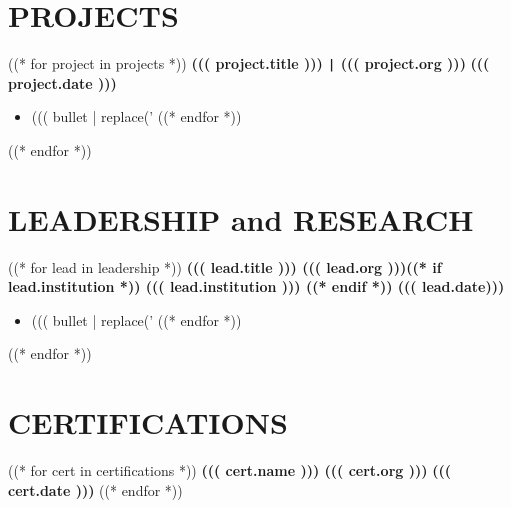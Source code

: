 \documentclass[10pt]{article}
\begin{document}
\vspace{-0.75cm}
\section*{PROJECTS}
\vspace{-0.1cm}
((* for project in projects *))
\noindent
\textbf{((( project.title ))) \texttt{|} ((( project.org )))} \hfill \textbf{((( project.date )))} \\
\vspace{-0.4cm}
\begin{itemize}[leftmargin=0.6cm, itemsep=-0.1cm, topsep=0cm]
((* for bullet in project.bullets *))
    \item ((( bullet | replace('%
((* endfor *))
\end{itemize}
((* endfor *))

\vspace{-0.4cm}
\section*{LEADERSHIP and RESEARCH}
\vspace{-0.1cm}
((* for lead in leadership *))
\noindent
\textbf{((( lead.title ))) \textbar{} ((( lead.org )))((* if lead.institution *)) \textbar{} ((( lead.institution ))) ((* endif *)) \hfill ((( lead.date)))} \\
\vspace{-0.4cm}
\begin{itemize}[leftmargin=0.6cm, itemsep=-0.1cm, topsep=0cm]
((* for bullet in lead.bullets *))
    \item ((( bullet | replace('%
((* endfor *))
\end{itemize}
((* endfor *))


\vspace{-0.4cm} 
\section*{CERTIFICATIONS} 
\vspace{-0.2cm}
((* for cert in certifications *))
\noindent
\textbf{((( cert.name ))) \textbar{} ((( cert.org ))) } \hfill \textbf{((( cert.date ))) }
((* endfor *))
\end{document}
